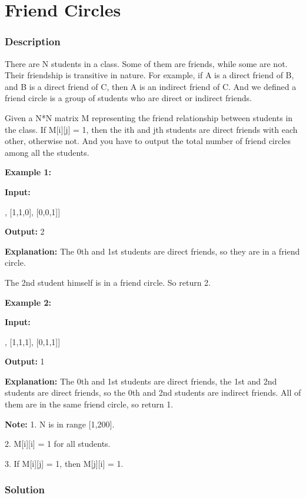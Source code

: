 \newpage

\section{Friend Circles} %

\subsubsection{Description}

There are N students in a class. Some of them are friends, while some are not. Their friendship is transitive in nature. For example, if A is a direct friend of B, and B is a direct friend of C, then A is an indirect friend of C. And we defined a friend circle is a group of students who are direct or indirect friends.

Given a N*N matrix M representing the friend relationship between students in the class. If M[i][j] = 1, then the ith and jth students are direct friends with each other, otherwise not. And you have to output the total number of friend circles among all the students.

\textbf{Example 1:}

\textbf{Input:}
\begin{Code}
[[1,1,0],
 [1,1,0],
 [0,0,1]]
\end{Code}

\textbf{Output:} 2

\textbf{Explanation:} The 0th and 1st students are direct friends, so they are in a friend circle.

The 2nd student himself is in a friend circle. So return 2.

\textbf{Example 2:}

\textbf{Input:}

\begin{Code}
[[1,1,0],
 [1,1,1],
 [0,1,1]]
\end{Code}

\textbf{Output:} 1

\textbf{Explanation:} The 0th and 1st students are direct friends, the 1st and 2nd students are direct friends,
so the 0th and 2nd students are indirect friends. All of them are in the same friend circle, so return 1.

\textbf{Note:}
1. N is in range [1,200].

2. M[i][i] = 1 for all students.

3. If M[i][j] = 1, then M[j][i] = 1.

\subsubsection{Solution}

